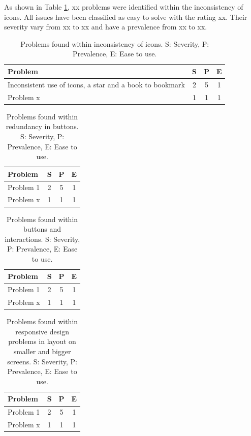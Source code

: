 \documentclass{sigchi}
\begin{document}
As shown in Table \ref{tab:icons}, xx problems were identified within the inconsistency of icons. All issues have been classified as easy to solve with the rating xx. Their severity vary from xx to xx and have a prevalence from xx to xx.  

\begin{table}[H]
    \centering
    \begin{tabular}{|m{6.5cm}|c|c|c|}
    \hline
        \textbf{Problem} & \textbf{S} & \textbf{P} & \textbf{E}\\
    \hline
         Inconsistent use of icons, a star and a book to bookmark  & 2 & 5 & 1\\
    \hline
         Problem x & 1 & 1 & 1\\
    \hline
    \end{tabular}
    \caption{Problems found within inconsistency of icons. S: Severity, P: Prevalence, E: Ease to use.}
    \label{tab:icons}
\end{table}

\begin{table}[H]
    \centering
    \begin{tabular}{|m{6.5cm}|c|c|c|}
    \hline
        \textbf{Problem} & \textbf{S} & \textbf{P} & \textbf{E}\\
    \hline
         Problem 1  & 2 & 5 & 1\\
    \hline
         Problem x & 1 & 1 & 1\\
    \hline
    \end{tabular}
    \caption{Problems found within redundancy in buttons. S: Severity, P: Prevalence, E: Ease to use.}
    \label{tab:redundancy}
\end{table}

\begin{table}[H]
    \centering
    \begin{tabular}{|m{6.5cm}|c|c|c|}
    \hline
        \textbf{Problem} & \textbf{S} & \textbf{P} & \textbf{E}\\
    \hline
         Problem 1  & 2 & 5 & 1\\
    \hline
         Problem x & 1 & 1 & 1\\
    \hline
    \end{tabular}
    \caption{Problems found within buttons and interactions. S: Severity, P: Prevalence, E: Ease to use.}
    \label{tab:interactions}
\end{table}

\begin{table}[H]
    \centering
    \begin{tabular}{|m{6.5cm}|c|c|c|}
    \hline
        \textbf{Problem} & \textbf{S} & \textbf{P} & \textbf{E}\\
    \hline
         Problem 1  & 2 & 5 & 1\\
    \hline
         Problem x & 1 & 1 & 1\\
    \hline
    \end{tabular}
    \caption{Problems found within responsive design problems in layout on smaller and bigger screens. S: Severity, P: Prevalence, E: Ease to use.}
    \label{tab:responsiveDesign}
\end{table}
\end{document}
